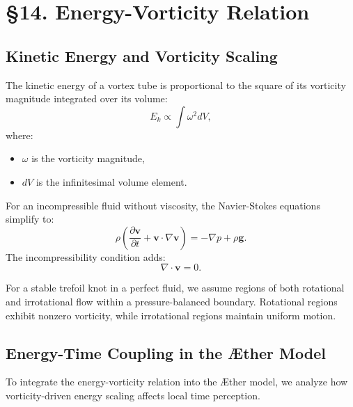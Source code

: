 

    \section*{§14. Energy-Vorticity Relation}

    \subsection*{Kinetic Energy and Vorticity Scaling}
    The kinetic energy of a vortex tube is proportional to the square of its vorticity magnitude integrated over its volume:
    \begin{equation}
        E_k \propto \int \omega^2 dV,
    \end{equation}
    where:
    \begin{itemize}
        \item $\omega$ is the vorticity magnitude,
        \item $dV$ is the infinitesimal volume element.
    \end{itemize}
    For an incompressible fluid without viscosity, the Navier-Stokes equations simplify to:
    \begin{equation}
        \rho \left( \frac{\partial \mathbf{v}}{\partial t} + \mathbf{v} \cdot \nabla \mathbf{v} \right) = - \nabla p + \rho \mathbf{g}.
    \end{equation}
    The incompressibility condition adds:
    \begin{equation}
        \nabla \cdot \mathbf{v} = 0.
    \end{equation}

    For a stable trefoil knot in a perfect fluid, we assume regions of both rotational and irrotational flow within a pressure-balanced boundary. Rotational regions exhibit nonzero vorticity, while irrotational regions maintain uniform motion.

    \subsection*{Energy-Time Coupling in the Æther Model}
    To integrate the energy-vorticity relation into the Æther model, we analyze how vorticity-driven energy scaling affects local time perception.

